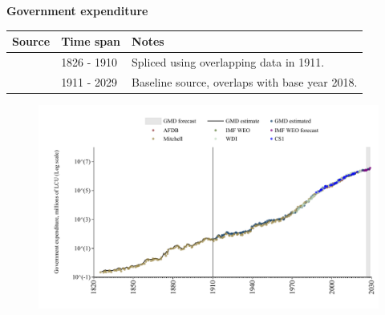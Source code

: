\documentclass[12pt,a4paper,landscape]{article}
\begin{document}
\begin{adjustbox}{max totalsize={\paperwidth}{\paperheight},center}
\begin{minipage}[t][\textheight][t]{\textwidth}
\vspace*{0.5cm}
{}
\begin{center}
{\Large\bfseries Government expenditure}
\end{center}
\vspace{0.5cm}
\begin{table}[H]
\centering
\small
\begin{tabular}{|l|l|l|}
\hline
\textbf{Source} & \textbf{Time span} & \textbf{Notes} \\
\hline
\rowcolor{white}\cite{Mitchell}& 1826 - 1910 &Spliced using overlapping data in 1911. \\
\rowcolor{lightgray}\cite{GMD_estimated}& 1911 - 2029 &Baseline source, overlaps with base year 2018. \\
\hline
\end{tabular}
\end{table}
\begin{figure}[H]
\centering
\includegraphics[width=\textwidth,height=0.6\textheight,keepaspectratio]{graphs/ZAF_govexp.pdf}
\end{figure}
\end{minipage}
\end{adjustbox}
\end{document}
